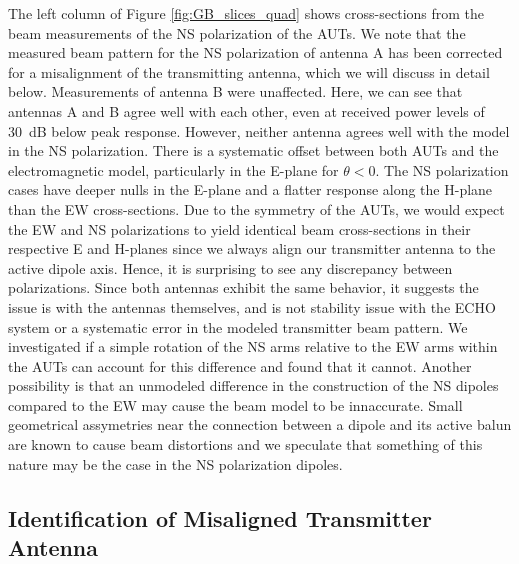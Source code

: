 \documentclass[preprint2,numberedappendix,tighten,twocolappendix]{aastex6}
\begin{document}
The left column of Figure \ref{fig:GB_slices_quad} shows cross-sections from the beam measurements of the NS polarization of the AUTs.  We note that the measured beam pattern for the NS polarization of antenna A has been corrected for a misalignment of the transmitting antenna, which we will discuss in detail below.  Measurements of antenna B were unaffected.   Here, we can see that antennas A and B agree well with each other, even at received power levels of 30~dB below peak response.  However, neither antenna agrees well with the model in the NS polarization.  There is a systematic offset between both AUTs and the electromagnetic model, particularly in the E-plane for $\theta<0$\arcdeg{}.  The NS polarization cases have deeper nulls in the E-plane and a flatter response along the H-plane than the EW cross-sections.   Due to the symmetry of the AUTs, we would expect the EW and NS polarizations to yield identical beam cross-sections in their respective E and H-planes since we always align our transmitter antenna to the active dipole axis.  Hence, it is surprising to see any discrepancy between polarizations.  Since both antennas exhibit the same behavior, it suggests the issue is with the antennas themselves, and is not stability issue with the ECHO system or a systematic error in the modeled transmitter beam pattern.  We investigated if a simple rotation of the NS arms relative to the EW arms within the AUTs can account for this difference and found that it cannot.  Another possibility is that an unmodeled difference in the construction of the NS dipoles compared to the EW may cause the beam model to be innaccurate.  Small geometrical assymetries near the connection between a dipole and its active balun are known to cause beam distortions and we speculate that something of this nature may be the case in the NS polarization dipoles. 


\subsection{Identification of Misaligned Transmitter Antenna}
\label{sec:orbcomm}
\end{document}
